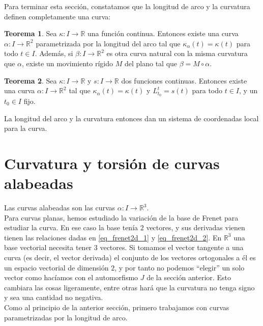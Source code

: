\documentclass{article}
\theoremstyle{definition}
\newtheorem{theorem}{Teorema}
\newcommand{\reales}{\mathbb{R}}
\begin{document}
Para terminar esta sección, constatamos que la longitud de arco y la curvatura definen completamente una curva:

\begin{theorem}
	Sea $\kappa : I \rightarrow \reales$ una función continua. Entonces existe una curva $\alpha : I \rightarrow \reales^2$ parametrizada por la longitud del arco tal que $\kappa_{\alpha}(t) = \kappa(t)$ para todo $t \in I$. Además, si $\beta : I \rightarrow \reales^2$ es otra curva natural con la misma curvatura que $\alpha$, existe un movimiento rígido $M$ del plano tal que $\beta = M \circ \alpha$.
\end{theorem}	
	
\begin{theorem}
	Sea $\kappa : I \rightarrow \reales$ y $s : I \rightarrow \reales$ dos funciones continuas. Entonces existe una curva $\alpha : I \rightarrow \reales^2$ tal que $\kappa_{\alpha}(t) = \kappa(t)$ y $L_{t_0}^{t} = s(t)$ para todo $t \in I$, y un $t_0 \in I$ fijo.
\end{theorem}

La longitud del arco y la curvatura entonces dan un sistema de coordenadas local para la curva.









\section{Curvatura y torsión de curvas alabeadas}
Las curvas alabeadas son las curvas $\alpha : I \rightarrow \reales^3$. \\ 
Para curvas planas, hemos estudiado la variación de la base de Frenet para estudiar la curva. En ese caso la base tenía $2$ vectores, y sus derivadas vienen tienen las relaciones dadas en \eqref{eq_frenet2d_1} y \eqref{eq_frenet2d_2}. En $\reales^3$ una base vectorial necesita tener $3$ vectores. Si tomamos el vector tangente a una curva (es decir, el vector derivada) el conjunto de los vectores ortogonales a él es un espacio vectorial de dimensión $2$, y por tanto no podemos ``elegir'' un solo vector como hacíamos con el automorfismo $J$ de la sección anterior. Esto cambiara las cosas ligeramente, entre otras hará que la curvatura no tenga signo y sea una cantidad no negativa. \\
Como al principio de la anterior sección, primero trabajamos con curvas parametrizadas por la longitud de arco.
\end{document}
